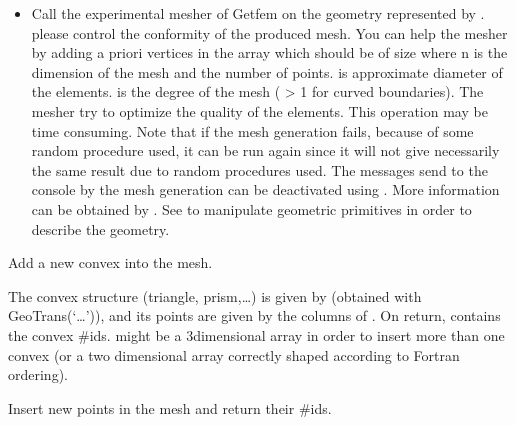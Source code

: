 \documentclass[a4paper,11pt,english]{sphinxmanual}
\begin{document}
\begin{fulllineitems}
\begin{itemize}
\item {} 
Call the experimental mesher of Getfem on the geometry
represented by . please control the conformity of the produced mesh.
You can help the mesher by adding a priori vertices in the array
 which should be of size  where  n is the
dimension of the mesh and  the number of points.  is
approximate diameter of the elements.  is the degree of the
mesh ( \textgreater{} 1 for curved boundaries).  The mesher try to optimize the
quality of the elements. This operation may be time consuming.
Note that if the mesh generation fails, because of some random
procedure used, it can be run again since it will not give necessarily
the same result due to random procedures used.
The messages send to the console by the mesh generation can be
deactivated using . More information
can be obtained by . See 
to manipulate geometric primitives in order to describe the geometry.

\end{itemize}

\begin{fulllineitems}
\label{\detokenize{python/cmdref_Mesh:getfem.Mesh.add_convex}}
Add a new convex into the mesh.

The convex structure (triangle, prism,…) is given by 
(obtained with GeoTrans(‘…’)), and its points are given by
the columns of . On return,  contains the convex \#ids.
 might be a 3\sphinxhyphen{}dimensional array in order to insert more than
one convex (or a two dimensional array correctly shaped according
to Fortran ordering).

\end{fulllineitems}


\begin{fulllineitems}
\label{\detokenize{python/cmdref_Mesh:getfem.Mesh.add_point}}
Insert new points in the mesh and return their \#ids.


\end{fulllineitems}
\end{fulllineitems}
\end{document}
